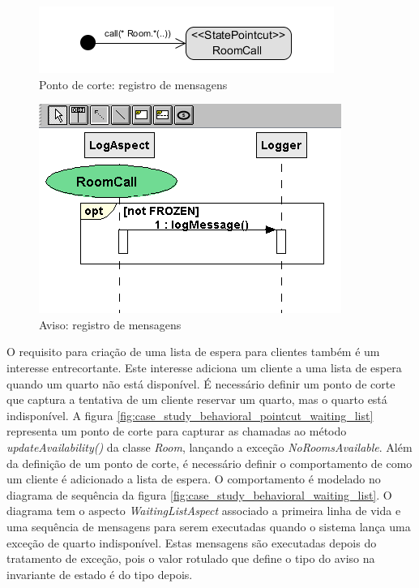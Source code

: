   \begin{figure}
	\centering
	\includegraphics{img/case_study_behavioral_pointcut_log.png}
	\caption{Ponto de corte: registro de mensagens}\label{fig:case_study_behavioral_pointcut_log}
  \end{figure}
  
  \begin{figure}
	\centering
	\includegraphics{img/case_study_behavioral_log.png}
	\caption{Aviso: registro de mensagens}\label{fig:case_study_behavioral_log}
  \end{figure}

O requisito para criação de uma lista de espera para clientes também é um interesse entrecortante. Este interesse adiciona um cliente a uma lista de
espera quando um quarto não está disponível. É necessário definir um ponto de corte que captura a tentativa de um cliente reservar um
quarto, mas o quarto está indisponível. A figura \ref{fig:case_study_behavioral_pointcut_waiting_list} representa um ponto de corte
para capturar as chamadas ao método \textit{updateAvailability()} da classe \textit{Room}, lançando a exceção \textit{NoRoomsAvailable}. Além da
definição de um ponto de corte, é necessário definir o comportamento de como um cliente é adicionado a lista de espera. O comportamento é modelado no
diagrama de sequência da figura \ref{fig:case_study_behavioral_waiting_list}. O diagrama tem o aspecto \textit{WaitingListAspect} associado a primeira 
linha de vida e uma sequência de mensagens para serem executadas quando o sistema lança uma exceção de quarto indisponível. Estas
mensagens são executadas depois do tratamento de exceção, pois o valor rotulado que define o tipo do aviso na invariante de estado é do tipo depois.

